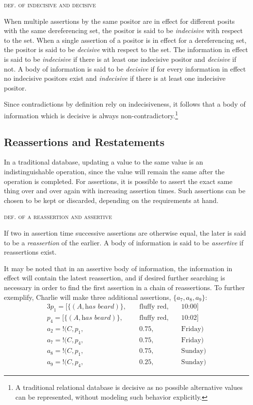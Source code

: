 \documentclass[sfsidenotes,nobib,twoside,symmetric]{tufte-handout}
\newcommand{\assert}{\text{!}}
\newcounter{majorcount}
\newcommand{\deffy}[3]{
	\vspace{2ex}
	\refstepcounter{majorcount} 
	\noindent\textsc{#1}%
	\\\begin{small}
	\noindent #2%
	\label{Def:#3}
	\end{small}
	\vspace{2ex}
}
\begin{document}
\deffy{def. of indecisive and decisive}{%
When multiple assertions by the same positor are in effect for different posits with the same dereferencing set, the positor is said to be \emph{indecisive} with respect to the set. When a single assertion of a positor is in effect for a dereferencing set, the positor is said to be \emph{decisive} with respect to the set. The information in effect is said to be \emph{indecisive} if there is at least one indecisive positor and \emph{decisive} if not. A body of information is said to be \emph{decisive} if for every information in effect no indecisive positors exist and \emph{indecisive} if there is at least one indecisive positor.
}{decisiveness}

Since contradictions by definition rely on indecisiveness, it follows that a body of information which is decisive is always non-contradictory.\footnote{A traditional relational database is decisive as no possible alternative values can be represented, without modeling such behavior explicitly.}

\subsection{Reassertions and Restatements}
%
In a traditional database, updating a value to the same value is an indistinguishable operation, since the value will remain the same after the operation is completed. For assertions, it is possible to assert the exact same thing over and over again with increasing assertion times. Such assertions can be chosen to be kept or discarded, depending on the requirements at hand. 

\deffy{def. of a reassertion and assertive}{%
If two in assertion time successive assertions are otherwise equal, the later is said to be a \emph{reassertion} of the earlier. A body of information is said to be \emph{assertive} if reassertions exist.
}{assertive}

It may be noted that in an assertive body of information, the information in effect will contain the latest reassertion, and if desired further searching is necessary in order to find the first assertion in a chain of reassertions. To further exemplify, Charlie will make three additional assertions, $\{a_7, a_8, a_9\}$:
\begin{alignat*}{3}
p_{1} = [\{(A, \textit{has beard})\},\;&& \textrm{fluffy red},\;&& \textrm{10:00}]  \\
p_{4} = [\{(A, \textit{has beard})\},\;&& \textrm{fluffy red},\;&& \textrm{10:02}] \\
a_2 = \assert(C, p_{1},\;&& 0.75,\;&& \textrm{Friday}) \\
a_7 = \assert(C, p_{4},\;&& 0.75,\;&& \textrm{Friday}) \\
a_8 = \assert(C, p_{1},\;&& 0.75,\;&& \textrm{Sunday}) \\
a_9 = \assert(C, p_{4},\;&& 0.25,\;&& \textrm{Sunday}) 
\end{alignat*}
 
\end{document}
